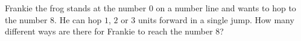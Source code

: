 Frankie the frog stands at the number $0$ on a number line and wants to hop to the number $8$. He can hop $1$, $2$ or $3$ units forward in a single jump. How many different ways are there for Frankie to reach the number $8$?
